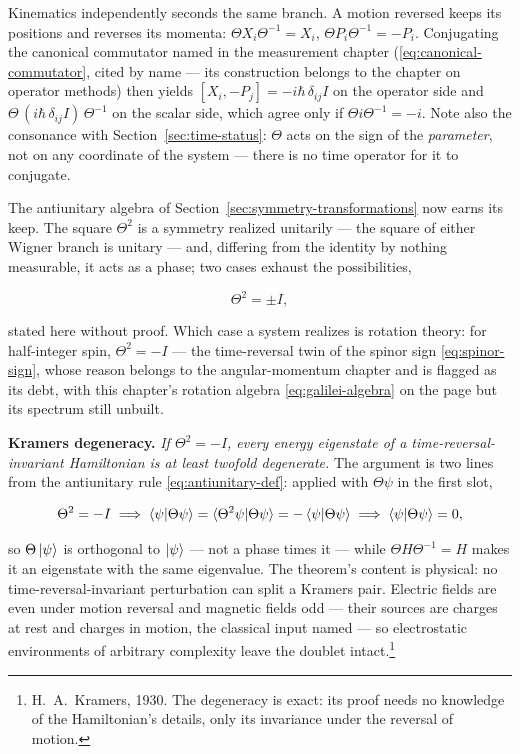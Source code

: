Kinematics independently seconds the same branch. A motion reversed keeps its positions and reverses its momenta: $\Theta X_i \Theta^{-1} = X_i$, $\Theta P_i \Theta^{-1} = -P_i$. Conjugating the canonical commutator named in the measurement chapter (\eqref{eq:canonical-commutator}, cited by name --- its construction belongs to the chapter on operator methods) then yields $[X_i, -P_j] = -i\hbar\,\delta_{ij}I$ on the operator side and $\Theta\,(i\hbar\,\delta_{ij}I)\,\Theta^{-1}$ on the scalar side, which agree only if $\Theta i \Theta^{-1} = -i$. Note also the consonance with Section~\ref{sec:time-status}: $\Theta$ acts on the sign of the \emph{parameter}, not on any coordinate of the system --- there is no time operator for it to conjugate.

The antiunitary algebra of Section~\ref{sec:symmetry-transformations} now earns its keep. The square $\Theta^2$ is a symmetry realized unitarily --- the square of either Wigner branch is unitary --- and, differing from the identity by nothing measurable, it acts as a phase; two cases exhaust the possibilities,
\begin{linenomath}
    \begin{equation}
        \Theta^2 = \pm I ,
        \label{eq:theta-squared}
    \end{equation}
\end{linenomath}
stated here without proof. Which case a system realizes is rotation theory: for half-integer spin, $\Theta^2 = -I$ --- the time-reversal twin of the spinor sign \eqref{eq:spinor-sign}, whose reason belongs to the angular-momentum chapter and is flagged as its debt, with this chapter's rotation algebra \eqref{eq:galilei-algebra} on the page but its spectrum still unbuilt.

\textbf{Kramers degeneracy.} \emph{If $\Theta^2 = -I$, every energy eigenstate of a time-reversal-invariant Hamiltonian is at least twofold degenerate.} The argument is two lines from the antiunitary rule \eqref{eq:antiunitary-def}: applied with $\Theta\psi$ in the first slot,
\begin{linenomath}
    \begin{equation}
        \Theta^2 = -I
        \;\Longrightarrow\;
        \braket{\psi|\Theta\psi} = \braket{\Theta^2\psi|\Theta\psi} = -\braket{\psi|\Theta\psi}
        \;\Longrightarrow\;
        \braket{\psi|\Theta\psi} = 0 ,
        \label{eq:kramers}
    \end{equation}
\end{linenomath}
so $\Theta\ket{\psi}$ is orthogonal to $\ket{\psi}$ --- not a phase times it --- while $\Theta H \Theta^{-1} = H$ makes it an eigenstate with the same eigenvalue. The theorem's content is physical: no time-reversal-invariant perturbation can split a Kramers pair. Electric fields are even under motion reversal and magnetic fields odd --- their sources are charges at rest and charges in motion, the classical input named --- so electrostatic environments of arbitrary complexity leave the doublet intact.\footnote{H.~A.~Kramers, 1930. The degeneracy is exact: its proof needs no knowledge of the Hamiltonian's details, only its invariance under the reversal of motion.}

